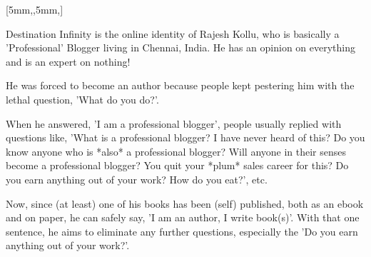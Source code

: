 \documentclass[
    coverheight=148mm, coverwidth=105mm, spinewidth=10mm,
    bleedwidth=31mm,
    markcolor=white,
    foldingmargin=true, 12pt
]{bookcover}
\begin{document}
\begin{bookcover}
    [5mm,,5mm,]{
        \setlength{\parskip}{1ex}
        \vfill
        Destination Infinity is the online identity of Rajesh Kollu, who is basically a
        'Professional' Blogger living in Chennai, India. He has an opinion on everything
        and is an expert on nothing!

        He was forced to become an author because people kept pestering him with the
        lethal question, 'What do you do?'.

        When he answered, 'I am a professional blogger', people usually replied with
        questions like, 'What is a professional blogger? I have never heard of this? Do
        you know anyone who is *also* a professional blogger? Will anyone in their
        senses become a professional blogger? You quit your *plum* sales career for
        this? Do you earn anything out of your work? How do you eat?', etc.

        Now, since (at least) one of his books has been (self) published, both as an
        ebook and on paper, he can safely
        say, 'I am an author, I write book(s)'. With that one sentence, he aims to
        eliminate any further questions, especially the 'Do you earn anything out of
        your work?'.

}
\end{bookcover}
\end{document}
